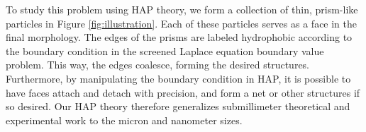 To study this problem using HAP theory, we form a collection of thin, prism-like particles in Figure \ref{fig:illustration}. 
Each of these particles serves as a face in the final morphology. The edges of the prisms are labeled hydrophobic according to the boundary condition in the screened Laplace equation boundary value problem. This way, the edges coalesce, forming the desired structures. Furthermore, 
by manipulating the boundary condition in HAP, it is possible to have faces attach and detach with precision, and form a net or other structures if so desired. Our HAP theory therefore generalizes submillimeter theoretical and experimental work to the micron and nanometer sizes. 


